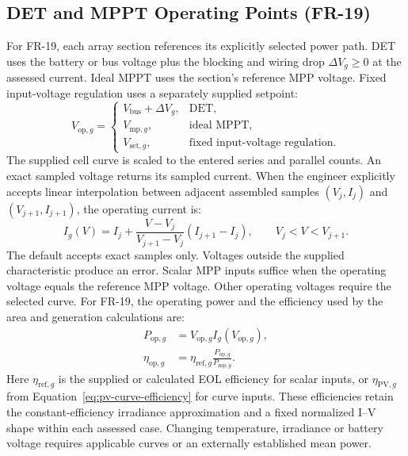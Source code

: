 \subsection{DET and MPPT Operating Points (FR-19)}
For FR-19, each array section references its explicitly selected power path. DET uses the battery or bus voltage plus the blocking and wiring drop $\Delta V_g\geq0$ at the assessed current. Ideal MPPT uses the section's reference MPP voltage. Fixed input-voltage regulation uses a separately supplied setpoint:
\begin{equation}
    V_{\mathrm{op},g}=\begin{cases}
        V_{\mathrm{bus}}+\Delta V_g, & \text{DET},\\
        V_{\mathrm{mp},g}, & \text{ideal MPPT},\\
        V_{\mathrm{set},g}, & \text{fixed input-voltage regulation}.
    \end{cases}
    \label{eq:solar-operating-voltage}
\end{equation}
The supplied cell curve is scaled to the entered series and parallel counts. An exact sampled voltage returns its sampled current. When the engineer explicitly accepts linear interpolation between adjacent assembled samples $(V_j,I_j)$ and $(V_{j+1},I_{j+1})$, the operating current is:
\begin{equation}
    I_g(V)=I_j+\frac{V-V_j}{V_{j+1}-V_j}(I_{j+1}-I_j),
    \qquad V_j<V<V_{j+1}.
    \label{eq:pv-operating-interpolation}
\end{equation}
The default accepts exact samples only. Voltages outside the supplied characteristic produce an error. Scalar MPP inputs suffice when the operating voltage equals the reference MPP voltage. Other operating voltages require the selected curve. For FR-19, the operating power and the efficiency used by the area and generation calculations are:
\begin{align}
    P_{\mathrm{op},g}&=V_{\mathrm{op},g}I_g(V_{\mathrm{op},g}),
    \label{eq:solar-operating-power}\\
    \eta_{\mathrm{op},g}&=\eta_{\mathrm{ref},g}
    \frac{P_{\mathrm{op},g}}{P_{\mathrm{mp},g}}.
    \label{eq:pv-operating-efficiency}
\end{align}
Here $\eta_{\mathrm{ref},g}$ is the supplied or calculated EOL efficiency for scalar inputs, or $\eta_{\mathrm{PV},g}$ from Equation~\eqref{eq:pv-curve-efficiency} for curve inputs. These efficiencies retain the constant-efficiency irradiance approximation and a fixed normalized I--V shape within each assessed case. Changing temperature, irradiance or battery voltage requires applicable curves or an externally established mean power.

